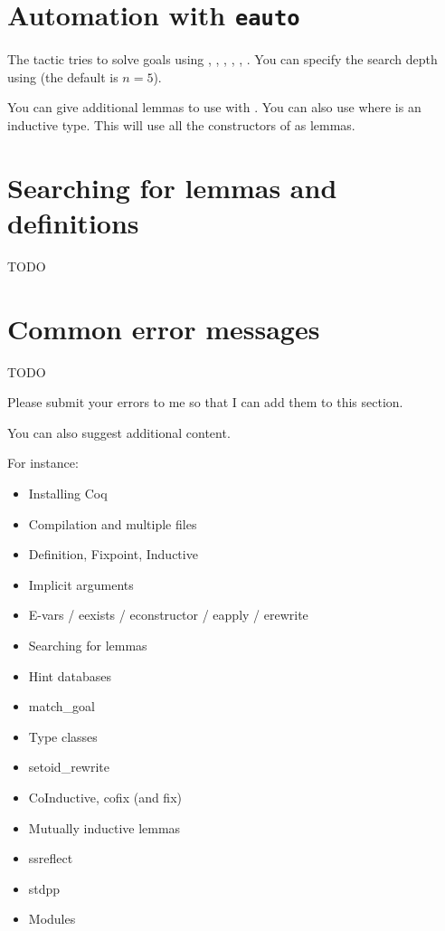 \section{Automation with \texttt{eauto}}

The  tactic tries to solve goals using , , , , , .
You can specify the search depth using  (the default is $n=5$).

You can give  additional lemmas to use with .
You can also use  where  is an inductive type. This will use all the constructors of  as lemmas.

\section{Searching for lemmas and definitions}

TODO

\section{Common error messages}

TODO

Please submit your errors to me so that I can add them to this section.

You can also suggest additional content.

For instance:

\begin{itemize}
  \item Installing Coq
  \item Compilation and multiple files
  \item Definition, Fixpoint, Inductive
  \item Implicit arguments
  \item E-vars / eexists / econstructor / eapply / erewrite
  \item Searching for lemmas
  \item Hint databases
  \item match\_goal
  \item Type classes
  \item setoid\_rewrite
  \item CoInductive, cofix (and fix)
  \item Mutually inductive lemmas
  \item ssreflect
  \item stdpp
  \item Modules
\end{itemize}

